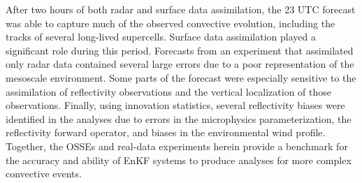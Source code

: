 \begin{preface}
After two hours of both radar and surface data assimilation, the 23 UTC forecast was able to capture much of the observed convective evolution, including the tracks of several long-lived supercells. Surface data assimilation played a significant role during this period. Forecasts from an experiment that assimilated only radar data contained several large errors due to a poor representation of the mesoscale environment. Some parts of the forecast were especially sensitive to the assimilation of reflectivity observations and the vertical localization of those observations. Finally, using innovation statistics, several reflectivity biases were identified in the analyses due to errors in the microphysics parameterization, the reflectivity forward operator, and biases in the environmental wind profile. Together, the OSSEs and real-data experiments herein provide a benchmark for the accuracy and ability of EnKF systems to produce analyses for more complex convective events.
\end{preface}
